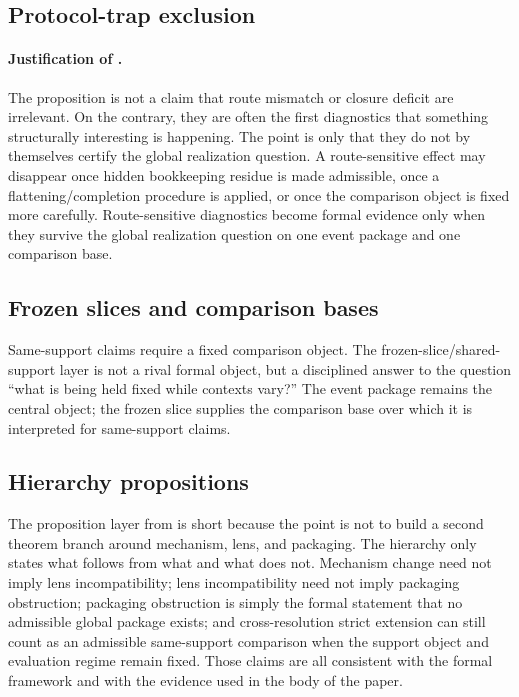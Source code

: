\documentclass[11pt]{article}
\theoremstyle{definition}
\begin{document}
\subsection{Protocol-trap exclusion}

\paragraph{Justification of .}
The proposition is not a claim that route mismatch or closure deficit are irrelevant. On the contrary, they are often the first diagnostics that something structurally interesting is happening. The point is only that they do not by themselves certify the global realization question. A route-sensitive effect may disappear once hidden bookkeeping residue is made admissible, once a flattening/completion procedure is applied, or once the comparison object is fixed more carefully. Route-sensitive diagnostics become formal evidence only when they survive the global realization question on one event package and one comparison base.

\subsection{Frozen slices and comparison bases}

Same-support claims require a fixed comparison object. The frozen-slice/shared-support layer is not a rival formal object, but a disciplined answer to the question ``what is being held fixed while contexts vary?'' The event package remains the central object; the frozen slice supplies the comparison base over which it is interpreted for same-support claims.

\subsection{Hierarchy propositions}

The proposition layer from  is short because the point is not to build a second theorem branch around mechanism, lens, and packaging. The hierarchy only states what follows from what and what does not. Mechanism change need not imply lens incompatibility; lens incompatibility need not imply packaging obstruction; packaging obstruction is simply the formal statement that no admissible global package exists; and cross-resolution strict extension can still count as an admissible same-support comparison when the support object and evaluation regime remain fixed. Those claims are all consistent with the formal framework and with the evidence used in the body of the paper.
\end{document}
